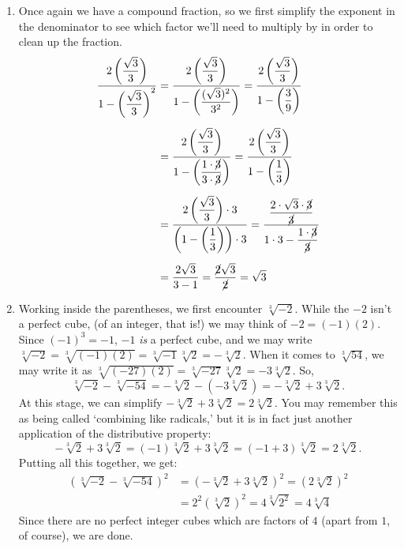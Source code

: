 {\begin{enumerate}
\item  Once again we have a compound fraction, so we first simplify the exponent in the denominator to see which factor we'll need to multiply by in order to clean up the fraction.
\begin{align*}
\dfrac{2 \left( \dfrac{\sqrt{3}}{3}\right)}{1 - \left( \dfrac{\sqrt{3}}{3} \right)^2} & = \dfrac{2 \left( \dfrac{\sqrt{3}}{3}\right)}{1 - \left( \dfrac{(\sqrt{3})^2}{3^2} \right)}  = \dfrac{2 \left( \dfrac{\sqrt{3}}{3}\right)}{1 - \left( \dfrac{3}{9} \right)}\\[5pt]
& = \dfrac{2 \left( \dfrac{\sqrt{3}}{3}\right)}{1 - \left( \dfrac{1 \cdot \cancel{3}}{3 \cdot \cancel{3}} \right)}  =  \dfrac{2 \left( \dfrac{\sqrt{3}}{3}\right)}{1 - \left( \dfrac{1}{3} \right)} \\[5pt]
& =  \dfrac{2 \left( \dfrac{\sqrt{3}}{3}\right) \cdot 3}{\left(1 - \left( \dfrac{1}{3} \right)\right) \cdot 3}  =  \dfrac{\dfrac{2 \cdot \sqrt{3} \cdot \cancel{3}}{\cancel{3}}}{1\cdot 3 -  \dfrac{1\cdot \cancel{3}}{\cancel{3}}} \\[5pt]
& = \dfrac{2 \sqrt{3}}{3 - 1}  = \dfrac{\cancel{2} \sqrt{3}}{\cancel{2}} = \sqrt{3} 
\end{align*}

\item  Working inside the parentheses, we first encounter $\sqrt[3]{-2}$.  While the $-2$ isn't a perfect cube, (of an integer, that is!) we may think of $-2 = (-1)(2)$.  Since $(-1)^3 = -1$, $-1$ \textit{is} a perfect cube, and we may write $\sqrt[3]{-2} = \sqrt[3]{(-1)(2)} = \sqrt[3]{-1} \sqrt[3]{2} = - \sqrt[3]{2}$. When it comes to $\sqrt[3]{54}$, we may write it as $\sqrt[3]{(-27)(2)} = \sqrt[3]{-27} \sqrt[3]{2} = -3 \sqrt[3]{2}$.  So, \[\sqrt[3]{-2} - \sqrt[3]{-54} = -\sqrt[3]{2} - (-3\sqrt[3]{2}) = -\sqrt[3]{2} + 3 \sqrt[3]{2}.\]  At this stage, we can simplify $-\sqrt[3]{2} + 3 \sqrt[3]{2} = 2 \sqrt[3]{2}$.  You may remember this as being called `combining like radicals,' but it is in fact just another application of the distributive property:  \[-\sqrt[3]{2} + 3\sqrt[3]{2} = (-1)\sqrt[3]{2} + 3 \sqrt[3]{2} = (-1+3)\sqrt[3]{2} = 2\sqrt[3]{2}.\] 
 Putting all this together, we get:
\begin{align*}
  (\sqrt[3]{-2} - \sqrt[3]{-54})^2 & =  (-\sqrt[3]{2} + 3 \sqrt[3]{2})^2   =  (2 \sqrt[3]{2})^2  \\ 
		& =  2^2 (\sqrt[3]{2})^2 = 4 \sqrt[3]{2^2}  =  4 \sqrt[3]{4}
\end{align*}
Since there are no perfect integer cubes which are factors of $4$ (apart from $1$, of course), we are done.


\end{enumerate}}
